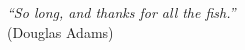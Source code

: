 \pagestyle{empty}
\chapter*{}
\vspace{17.5cm}
\vfill
\hfill
\begin{flushright}
{\it``So long, and thanks for all the fish.''}\\
(Douglas Adams)
\end{flushright}

